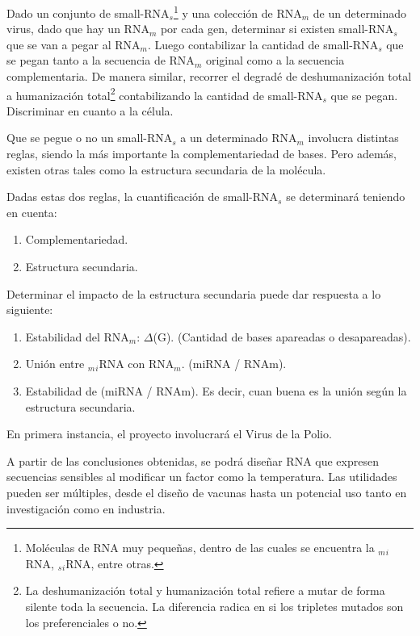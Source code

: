 \documentclass[12pt,a4paper]{article}
\begin{document}
\par Dado un conjunto de small-RNA$_s$\footnote{Moléculas de RNA muy pequeñas, dentro de las cuales se encuentra la $_m$$_i$RNA, $_s$$_i$RNA, entre otras.} y una colección de RNA$_m$ de un determinado virus, dado que hay un RNA$_m$ por cada gen, determinar si existen small-RNA$_s$ que se van a pegar al RNA$_m$. Luego contabilizar la cantidad de small-RNA$_s$ que se pegan tanto a la secuencia de RNA$_m$ original como a la secuencia complementaria. De manera similar, recorrer el degradé de deshumanización total a humanización total\footnote{La deshumanización total y humanización total refiere a mutar de forma silente toda la secuencia. La diferencia radica en si los tripletes mutados son los preferenciales o no.} contabilizando la cantidad de small-RNA$_s$ que se pegan. Discriminar en cuanto a la célula.

\par Que se pegue o no un small-RNA$_s$ a un determinado RNA$_m$ involucra distintas reglas, siendo la más importante la complementariedad de bases. Pero además, existen otras tales como la estructura secundaria de la molécula.

\par Dadas estas dos reglas, la cuantificación de small-RNA$_s$ se determinará teniendo en cuenta:
\begin{enumerate}
	\item Complementariedad.
	\item Estructura secundaria.
\end{enumerate}

Determinar el impacto de la estructura secundaria puede dar respuesta a lo siguiente:
\begin{enumerate}
	\item Estabilidad del RNA$_m$: $\Delta$(G). (Cantidad de bases apareadas o desapareadas).
	\item Unión entre $_m$$_i$RNA con RNA$_m$. (miRNA / RNAm).
	\item Estabilidad de (miRNA / RNAm). Es decir, cuan buena es la unión según la estructura secundaria.
\end{enumerate}
En primera instancia, el proyecto involucrará el Virus de la Polio.

\par A partir de las conclusiones obtenidas, se podrá diseñar RNA que expresen secuencias sensibles al modificar un factor como la temperatura. Las utilidades pueden ser múltiples, desde el diseño de vacunas hasta un potencial uso tanto en investigación como en industria.	
\end{document}
